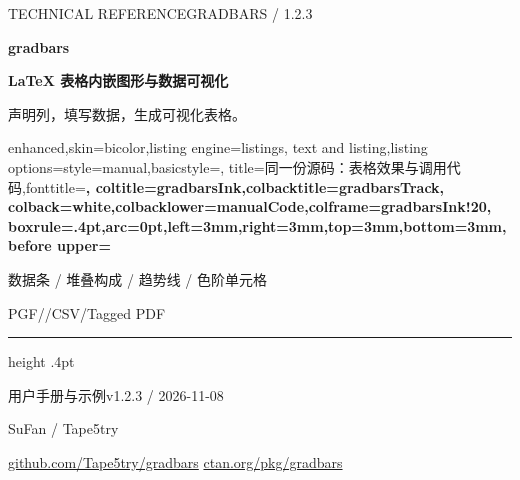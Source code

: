 \begingroup
\setlength{\parindent}{0pt}
\setlength{\parskip}{4pt}
\thispagestyle{empty}
{\small\sffamily\color{gradbarsTeal}TECHNICAL REFERENCE\hfill GRADBARS / 1.2.3}\par
\vspace{8mm}
{\fontsize{50}{54}\selectfont\sffamily\bfseries\color{gradbarsInk}gradbars}\par
\vspace{3mm}
{\Large\bfseries\color{gradbarsInk}\LaTeX{} 表格内嵌图形与数据可视化}\par
\vspace{3mm}
{\large\color{black!55}声明列，填写数据，生成可视化表格。}\par
\vspace{7mm}
\begin{tcblisting}{enhanced,skin=bicolor,listing engine=listings,
  text and listing,listing options={style=manual,basicstyle=\gradbarscodefont\fontsize{8}{10}\selectfont},
  title={同一份源码：表格效果与调用代码},fonttitle=\small\bfseries,
  coltitle=gradbarsInk,colbacktitle=gradbarsTrack,
  colback=white,colbacklower=manualCode,colframe=gradbarsInk!20,
  boxrule=.4pt,arc=0pt,left=3mm,right=3mm,top=3mm,bottom=3mm,
  before upper={\small\setlength{\parindent}{0pt}}}
\begin{center}
\begin{gradtable}[align=c,header align=c,width=\linewidth,column sep=4pt,row stretch=1.5,label width=7mm]
\end{gradtable}
\end{center}
\end{tcblisting}
\vspace{3mm}
{\small\sffamily\color{gradbarsTeal}数据条 / 堆叠构成 / 趋势线 / 色阶单元格}\par
{\small\color{black!55}PGF/\manualTikZ{}\quad /\quad CSV\quad /\quad Tagged PDF}\par
\vfill
{\color{gradbarsInk!20}\hrule height .4pt}
\vspace{4mm}
{\small\sffamily\color{gradbarsInk}用户手册与示例\hfill v1.2.3 / 2026-11-08}\par
{\small\sffamily SuFan / Tape5try}\par
{\footnotesize\href{https://github.com/Tape5try/gradbars}{github.com/Tape5try/gradbars}
\hfill\href{https://ctan.org/pkg/gradbars}{ctan.org/pkg/gradbars}}\par
\endgroup
